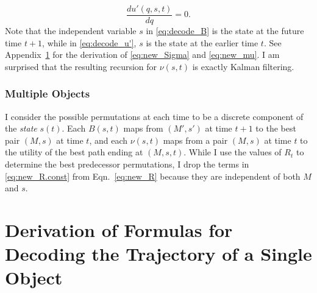 \documentclass[12pt]{article}
\newcommand{\ti}[2]{{#1}{(#2)}}                         %
\begin{document}
\begin{equation*}
  \frac{d u'(q,s,t)}{d q} = 0.
\end{equation*}
Note that the independent variable $s$ in \eqref{eq:decode_B} is the
state at the future time $t+1$, while in \eqref{eq:decode_u'}, $s$ is
the state at the earlier time $t$.  See Appendix~\ref{app:decode} for
the derivation of \eqref{eq:new_Sigma} and \eqref{eq:new_mu}.  I am
surprised that the resulting recursion for $\nu(s,t)$ is exactly
Kalman filtering.

\subsubsection{Multiple Objects}
\label{sec:multiple}

I consider the possible permutations at each time to be a discrete
component of the \emph{state} $\ti{s}{t}$.  Each $B(s,t)$ maps from
$(M',s')$ at time $t+1$ to the best pair $(M,s)$ at time $t$, and each
$\nu(s,t)$ maps from a pair $(M,s)$ at time $t$ to the utility of the
best path ending at $(M,s,t)$.  While I use the values of $R_{t}$ to
determine the best predecessor permutations, I drop the terms in
\eqref{eq:new_R.const} from Eqn.~\eqref{eq:new_R} because they are
independent of both $M$ and $s$.



\appendix
\section{Derivation of Formulas for Decoding the Trajectory of a Single Object}
\label{app:decode}
\end{document}
